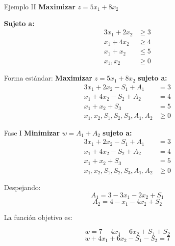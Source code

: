 \documentclass{beamer}
\begin{document}
\begin{frame}{Ejemplo II}
    \textbf{Maximizar} $z = 5x_1 + 8x_2$

    \textbf{Sujeto a:}
    \[
    \begin{aligned}
    3x_1 + 2x_2 &\geq 3 \\
    x_1 + 4x_2 &\geq 4 \\
    x_1 + x_2 &\leq 5 \\
    x_1, x_2 &\geq 0
    \end{aligned}
    \]

Forma estándar:
\textbf{Maximizar} $z = 5x_1 + 8x_2$ \textbf{sujeto a:}
    \[
    \begin{aligned}
    3x_1 + 2x_2 - S_1 + A_1 &= 3 \\
    x_1 + 4x_2 - S_2 + A_2 &= 4 \\
    x_1 + x_2 + S_3 &= 5 \\
    x_1, x_2, S_1, S_2, S_3, A_1, A_2 &\geq 0
    \end{aligned}
    \]
\end{frame}

\begin{frame}{Fase I}
    \textbf{Minimizar} $w = A_1 +A_2$ \textbf{sujeto a:}
    \[
    \begin{aligned}
    3x_1 + 2x_2 - S_1 + A_1 &= 3 \\
    x_1 + 4x_2 - S_2 + A_2 &= 4 \\
    x_1 + x_2 + S_3 &= 5 \\
    x_1, x_2, S_1, S_2, S_3, A_1, A_2 &\geq 0
    \end{aligned}
    \]

    Despejando:
    \[A_1 = 3 - 3x_1 - 2x_2 + S_1\]
    \[A_2 = 4 - x_1 - 4x_2 + S_2\]

    La función objetivo es:

    \[ w = 7 - 4x_1 - 6x_2 + S_1 + S_2\]
    \[ w + 4x_1 + 6x_2 -S_1 - S_2 = 7\]
\end{frame}
\end{document}
